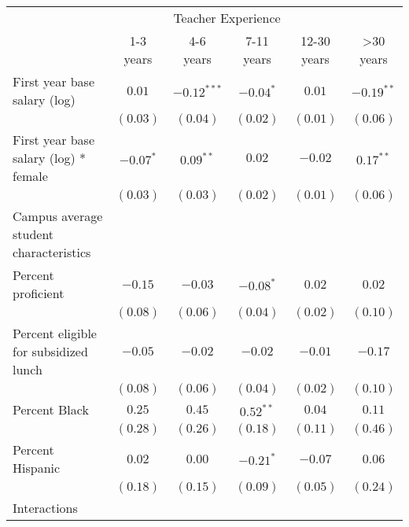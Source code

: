 \documentclass[12pt,]{article}
\begin{document}
\begin{sidewaystable}
\begin{center}
\begin{tabular}{l c c c c c }
\hline
 & \multicolumn{4}{c}{Teacher Experience} \\ \cline{2-6}
 & 1-3 years & 4-6 years & 7-11 years & 12-30 years & >30 years \\
\hline
First year base salary (log)                & $0.01$       & $-0.12^{***}$ & $-0.04^{*}$ & $0.01$       & $-0.19^{**}$ \\
                                            & $(0.03)$     & $(0.04)$      & $(0.02)$    & $(0.01)$     & $(0.06)$     \\
First year base salary (log) * female       & $-0.07^{*}$  & $0.09^{**}$   & $0.02$      & $-0.02$      & $0.17^{**}$  \\
                                            & $(0.03)$     & $(0.03)$      & $(0.02)$    & $(0.01)$     & $(0.06)$     \\
Campus average student characteristics      &              &               &             &              &              \\
\quad Percent proficient                    & $-0.15$      & $-0.03$       & $-0.08^{*}$ & $0.02$       & $0.02$       \\
                                            & $(0.08)$     & $(0.06)$      & $(0.04)$    & $(0.02)$     & $(0.10)$     \\
\quad Percent eligible for subsidized lunch & $-0.05$      & $-0.02$       & $-0.02$     & $-0.01$      & $-0.17$      \\
                                            & $(0.08)$     & $(0.06)$      & $(0.04)$    & $(0.02)$     & $(0.10)$     \\
\quad Percent Black                         & $0.25$       & $0.45$        & $0.52^{**}$ & $0.04$       & $0.11$       \\
                                            & $(0.28)$     & $(0.26)$      & $(0.18)$    & $(0.11)$     & $(0.46)$     \\
\quad Percent Hispanic                      & $0.02$       & $0.00$        & $-0.21^{*}$ & $-0.07$      & $0.06$       \\
                                            & $(0.18)$     & $(0.15)$      & $(0.09)$    & $(0.05)$     & $(0.24)$     \\
Interactions                                &              &               &             &              &              \\

\end{tabular}
\end{center}
\end{sidewaystable}
\end{document}
